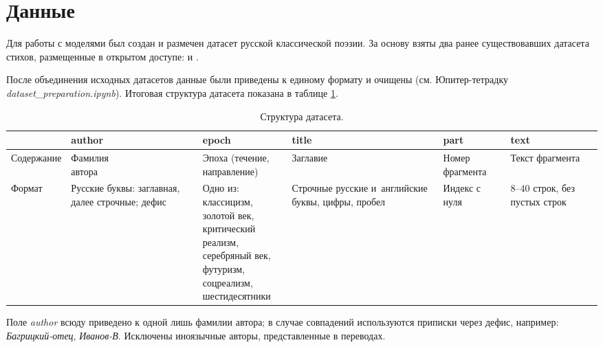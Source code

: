 \documentclass[a4paper,12pt]{article}
\begin{document}
\section{Данные}

Для работы с моделями был создан и размечен датасет русской классической поэзии. За основу взяты два ранее существовавших датасета стихов, размещенные в открытом доступе: \cite{russian_poetry_corpus} и \cite{russian_poems_19000}.

После объединения исходных датасетов данные были приведены к единому формату и очищены (см. Юпитер-тетрадку \textit{dataset\_preparation.ipynb}). Итоговая структура датасета показана в таблице \ref{tab:dataset}.

\begin{table}[t]
\centering
\begin{tabular}[t]{|m{1.4cm}|m{2.8cm}|m{4.2cm}|m{2.9cm}|m{1.3cm}|m{1.4cm}|}
    \hline
    & \textbf{author} & \textbf{epoch} & \textbf{title} & \textbf{part} & \textbf{text} \\
    \hline
    \hline
    Содер\-жание & \makecell[l]{Фамилия \\ автора} \par & \makecell[l]{Эпоха (течение, \\ направление)} \par & Заглавие & Номер фрагмента & Текст фрагмента \\
    \hline
    Формат & Русские буквы: заглавная, далее строчные; дефис & \makecell[l]{Одно из: \\ классицизм, \\ золотой век, \\ критический реализм, \\ серебряный век, \\ футуризм, \\ соцреализм, \\ шестидесятники} \par & Строчные русские и~английские буквы, цифры, пробел & Индекс с нуля & $8$--$40$ строк, без пустых строк \\
    \hline
\end{tabular}
\caption{Структура датасета.}
\label{tab:dataset}
\end{table}

Поле \textit{author} всюду приведено к одной лишь фамилии автора; в случае совпадений используются приписки через дефис, например: \textit{Багрицкий-отец}, \textit{Иванов-В}. Исключены иноязычные авторы, представленные в переводах.
\end{document}
